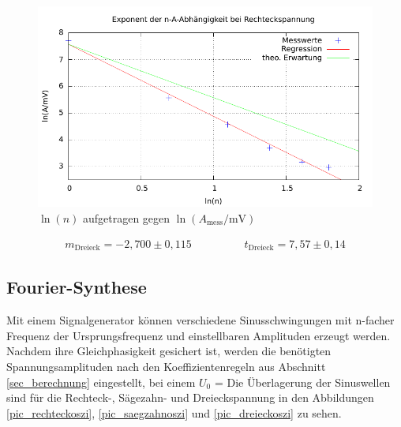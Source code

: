 \begin{figure}[H]
 \includegraphics[width=1\textwidth]{pics/dreieck.pdf}
 \caption{$\ln(n)$ aufgetragen gegen $\ln(A_{\text{mess}}/\text{mV})$}
 \label{pic_dreieckfit}
\end{figure}
\begin{align}
 m_{\text{Dreieck}} = -2,700 \pm 0,115 \hspace{2cm} t_{\text{Dreieck}} = 7,57 \pm 0,14
\end{align}

\subsection{Fourier-Synthese}
\label{sec_fourier}
Mit einem Signalgenerator können verschiedene Sinusschwingungen mit n-facher Frequenz der Ursprungsfrequenz und einstellbaren Amplituden
erzeugt werden. Nachdem ihre Gleichphasigkeit gesichert ist, werden die benötigten Spannungsamplituden nach den Koeffizientenregeln aus
Abschnitt \ref{sec_berechnung} eingestellt, bei einem $U_0$ =  Die Überlagerung der Sinuswellen sind für die Rechteck-, Sägezahn- und Dreieckspannung 
in den Abbildungen \ref{pic_rechteckoszi}, \ref{pic_saegzahnoszi} und \ref{pic_dreieckoszi} zu sehen.

